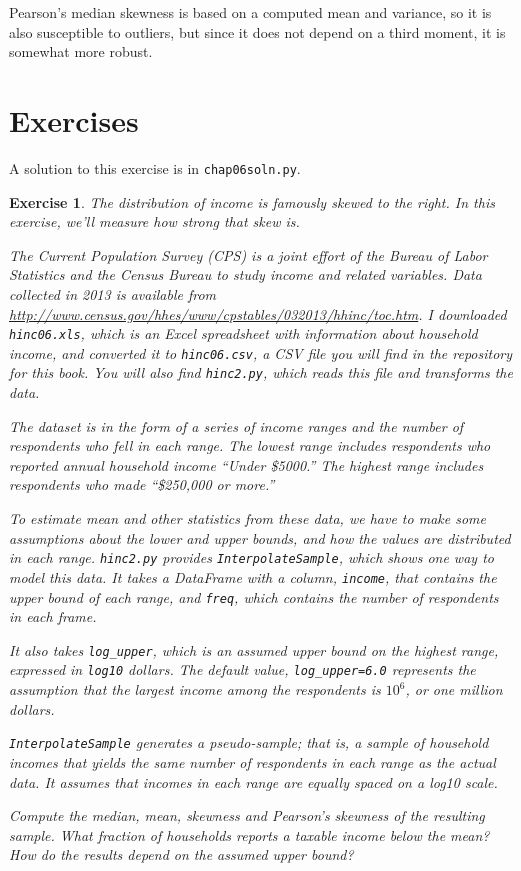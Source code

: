 \documentclass[12pt]{book}
\theoremstyle{exercise}
\newtheorem{exercise}{Exercise}[chapter]
\begin{document}
Pearson's median skewness is based on a computed mean and variance,
so it is also susceptible to outliers, but since it does not depend
on a third moment, it is somewhat more robust.%


\section{Exercises}

A solution to this exercise is in \verb"chap06soln.py".

\begin{exercise}

The distribution of income is famously skewed to the right.  In this
exercise, we'll measure how strong that skew is.%
%

The Current Population Survey (CPS) is a joint effort of the Bureau
of Labor Statistics and the Census Bureau to study income and related
variables.  Data collected in 2013 is available from
\url{http://www.census.gov/hhes/www/cpstables/032013/hhinc/toc.htm}.
I downloaded {\tt hinc06.xls}, which is an Excel spreadsheet with
information about household income, and converted it to {\tt hinc06.csv},
a CSV file you will find in the repository for this book.  You
will also find {\tt hinc2.py}, which reads this file and transforms
the data.%
%
%

The dataset is in the form of a series of income ranges and the number
of respondents who fell in each range.  The lowest range includes
respondents who reported annual household income ``Under \$5000.''
The highest range includes respondents who made ``\$250,000 or
more.''

To estimate mean and other statistics from these data, we have to
make some assumptions about the lower and upper bounds, and how
the values are distributed in each range.  {\tt hinc2.py} provides
{\tt InterpolateSample}, which shows one way to model
this data.  It takes a DataFrame with a column, {\tt income}, that
contains the upper bound of each range, and {\tt freq}, which contains
the number of respondents in each frame.%
%

It also takes \verb"log_upper", which is an assumed upper bound
on the highest range, expressed in {\tt log10} dollars.  
The default value, \verb"log_upper=6.0" represents the assumption
that the largest income among the respondents is
$10^6$, or one million dollars.

{\tt InterpolateSample} generates a pseudo-sample; that is, a sample
of household incomes that yields the same number of respondents
in each range as the actual data.  It assumes that incomes in
each range are equally spaced on a log10 scale.

Compute the median, mean, skewness and Pearson's skewness of the
resulting sample.  What fraction of households reports a taxable
income below the mean?  How do the results depend on the assumed
upper bound?
\end{exercise}
\end{document}

